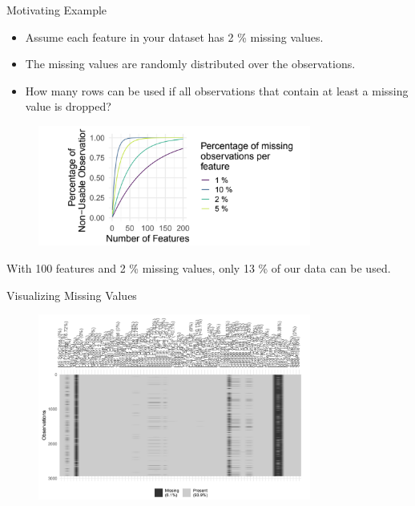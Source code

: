








\begin{vbframe}{Motivating Example}
\begin{itemize}
\item Assume each feature in your dataset has 2 \% missing values.
\item The missing values are randomly distributed over the observations.
\item How many rows can be used if all observations that contain at least a missing value is dropped?
\end{itemize}
\vspace{-0.3cm}

\begin{figure}
\includegraphics[width = 0.8\textwidth]{figure_man/motivating-example.png}
\end{figure}

With 100 features and 2 \% missing values, only 13 \% of our data can be used.
\end{vbframe}

\begin{vbframe}{Visualizing Missing Values}

\begin{figure}
\includegraphics[width = 0.8\textwidth]{figure_man/missing-values.png}
\end{figure}

\end{vbframe}

